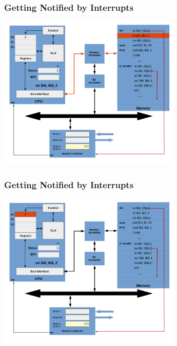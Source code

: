 \documentclass{beamer}
\begin{document}
\begin{frame}[fragile]
\frametitle{Getting Notified by Interrupts}

\begin{center}
\vspace*{-0.23cm}
\hspace*{-1cm}\includegraphics[width=8.7cm]{interrupt_waiting4.pdf}
\end{center}

\end{frame}

\begin{frame}[fragile]
\frametitle{Getting Notified by Interrupts}

\begin{center}
\vspace*{-0.23cm}
\hspace*{-1cm}\includegraphics[width=8.7cm]{interrupt_waiting5.pdf}
\end{center}

\end{frame}
\end{document}
